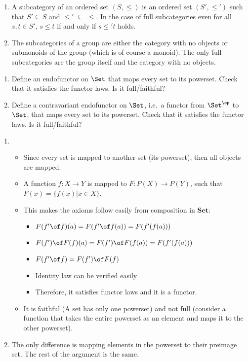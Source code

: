 \begin{answer}
  \begin{enumerate}
  \item A subcategory of an ordered set $(S,\leq)$ is an ordered set $(S',\leq')$ such that $S'\subseteq S$ and $\leq'\;\subseteq\;\leq$. In the case of full subcategories even for all $s,t\in S'$, $s\leq t$ if and only if $s\leq' t$ holds.
  \item The subcategories of a group are either the category with no objects or submonoids of the group (which is of course a monoid). The only full subcategories are the group itself and the category with no objects.
  \end{enumerate}
\end{answer}

\begin{exercise}
  \begin{enumerate}
    \item Define an endofunctor on $\Set$ that maps every set to its powerset.
      Check that it satisfies the functor laws.
      Is it full/faithful?
    \item Define a contravariant endofunctor on $\Set$, i.e.\ a functor from $\Set^\op$ to $\Set$, that maps every set to its powerset.
      Check that it satisfies the functor laws.
      Is it full/faithful?
  \end{enumerate}
\end{exercise}

\begin{answer}
\begin{enumerate}
   \item
   \begin{itemize}
   \item Since every set is mapped to another set (its powerset), then all objects are mapped.
   \item A function $f: X \rightarrow Y$ is mapped to $F: P(X) \rightarrow P(Y)$, such that $F(x)  = \{f(x) | x \in X\}$.
   \item This makes the axioms follow easily from composition in $\mathbf {Set}$:
   \begin{itemize}
   \item $F(f'\of f) (a) = F(f' \of f(a)) = F(f'(f(a)))$
   \item $F(f') \of F(f) (a) = F(f') \of F(f(a)) = F(f'(f(a)))$
   \item $F(f' \of f) = F(f') \of F(f)$
   \item Identity law can be verified easily
   \item Therefore, it satisfies functor laws and it is a functor.
   \end{itemize}
   \item It is faithful (A set has only one powerset) and not full (consider a function that takes the entire powerset as an element and maps it to the other powerset).
   \end{itemize}
   \item
   The only difference is mapping elements in the powerset to their preimage set. The rest of the argument is the same.
\end{enumerate}
\end{answer}

